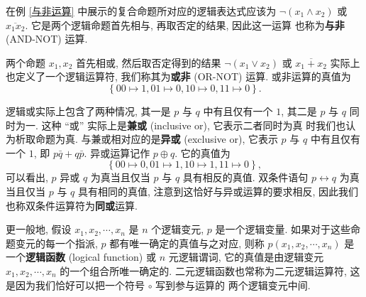 \documentclass[10pt,UTF8]{book} %
\begin{document}
\begin{example}
    在例 \ref{与非运算} 中展示的复合命题所对应的逻辑表达式应该为 $\lnot(x_1 \wedge x_2)$
    或 $\overline{x_1x_2}$. 它是两个逻辑命题首先相与, 再取否定的结果, 因此这一运算
    也称为\textbf{与非} (AND-NOT) 运算.
\end{example}
\begin{example}
    两个命题 $x_1, x_2$ 首先相或, 然后取否定得到的结果 $\lnot(x_1 \vee x_2)$ 或
    $\overline{x_1 + x_2}$ 实际上也定义了一个逻辑运算符, 
    我们称其为\textbf{或非} (OR-NOT) 运算. 或非运算的真值为
    \[ \left\{ 00 \mapsto 1, 01 \mapsto 0, 10 \mapsto 0, 11 \mapsto 0 \right\}. \]
\end{example}
\begin{example}
    逻辑或实际上包含了两种情况, 其一是 $p$ 与 $q$ 中有且仅有一个 $1$, 其二是 $p$ 与
    $q$ 同时为一. 这种 “或” 实际上是\textbf{兼或} (inclusive or), 它表示二者同时为真
    时我们也认为析取命题为真. 与兼或相对应的是\textbf{异或} (exclusive or), 它表示
    $p$ 与 $q$ 中有且仅有一个 $1$, 即 $p \bar q + q \bar p$. 异或运算记作 $p \oplus q$. 它的真值为
    \[ \left\{ 00 \mapsto 0, 01 \mapsto 1, 10 \mapsto 1, 11 \mapsto 0 \right\}, \] 
    可以看出, $p$ 异或 $q$ 为真当且仅当 $p$ 与 $q$ 具有相反的真值.
    双条件语句 $p \leftrightarrow q$ 为真当且仅当 $p$ 与 $q$ 具有相同的真值,
    注意到这恰好与异或运算的要求相反,
    因此我们也称双条件运算符为\textbf{同或}运算.
\end{example}

更一般地, 假设 $x_1, x_2, \cdots, x_n$ 是 $n$ 个逻辑变元,
$p$ 是一个逻辑变量. 如果对于这些命题变元的每一个指派, $p$ 都有唯一确定的真值与之对应,
则称 $p(x_1, x_2, \cdots, x_n)$ 是一个\textbf{逻辑函数} (logical function) 
或 $n$ 元逻辑谓词, 它的真值是由逻辑变元 $x_1, x_2, \cdots, x_n$ 的一个组合所唯一确定的.
二元逻辑函数也常称为二元逻辑运算符, 这是因为我们恰好可以把一个符号 $\circ$ 写到参与运算的
两个逻辑变元中间.

\end{document}
